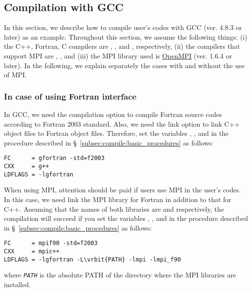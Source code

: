 \subsection{Compilation with GCC}
In this section, we describe how to compile user's codes with GCC (ver. 4.8.3 or later) as an example. Throughout this section, we assume the following things: (i) the C++, Fortran, C compilers are , , and , respectively, (ii) the compilers that support MPI are , , and  (iii) the MPI library used is \href{https://www.open-mpi.org}{OpenMPI} (ver. 1.6.4 or later). In the following, we explain separately the cases with and without the use of MPI.

\subsubsection{In case of using Fortran interface}
In GCC, we need the compilation option  to compile Fortran source codes according to Fortran 2003 standard. Also, we need the link option  to link C++ object files to Fortran object files. Therefore, set the variables , , and  in the procedure described in \S~\ref{subsec:compile:basic_procedures} as follows:
\begin{screen}
\begin{verbatim}
FC      = gfortran -std=f2003
CXX     = g++
LDFLAGS = -lgfortran
\end{verbatim}  
\end{screen}

When using MPI, attention should be paid if users use MPI in the user's codes. In this case, we need link the MPI library for Fortran in addition to that for C++. Assuming that the names of both libraries are  and  respectively, the compilation will succeed if you set the variables , , and  in the procedure described in \S~\ref{subsec:compile:basic_procedures} as follows:
\begin{screen}
\begin{Verbatim}[commandchars=\\\{\}]
FC      = mpif90 -std=f2003
CXX     = mpic++
LDFLAGS = -lgfortran -L\vrbit{PATH} -lmpi -lmpi_f90
\end{Verbatim}  
\end{screen}
where \textit{\texttt{PATH}} is the absolute PATH of the directory where the MPI libraries are installed.

